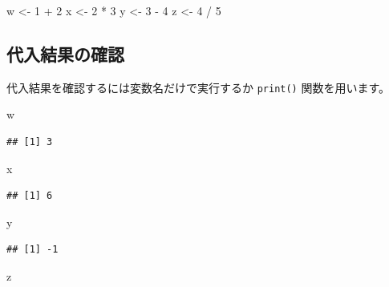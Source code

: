 \documentclass[
  12pt,
]{book}
\newenvironment{Shaded}{\begin{snugshade}}{\end{snugshade}}
\newcommand{\DecValTok}[1]{\textcolor[rgb]{0.00,0.00,0.81}{#1}}
\newcommand{\NormalTok}[1]{#1}
\newcommand{\OtherTok}[1]{\textcolor[rgb]{0.56,0.35,0.01}{#1}}
\newcommand{\SpecialCharTok}[1]{\textcolor[rgb]{0.00,0.00,0.00}{#1}}
\begin{document}
\begin{Shaded}
\begin{Highlighting}[]
\NormalTok{w }\OtherTok{\textless{}{-}} \DecValTok{1} \SpecialCharTok{+} \DecValTok{2}
\NormalTok{x }\OtherTok{\textless{}{-}} \DecValTok{2} \SpecialCharTok{*} \DecValTok{3}
\NormalTok{y }\OtherTok{\textless{}{-}} \DecValTok{3} \SpecialCharTok{{-}} \DecValTok{4}
\NormalTok{z }\OtherTok{\textless{}{-}} \DecValTok{4} \SpecialCharTok{/} \DecValTok{5}
\end{Highlighting}
\end{Shaded}

\hypertarget{ux4ee3ux5165ux7d50ux679cux306eux78baux8a8d}{%
\subsection{代入結果の確認}\label{ux4ee3ux5165ux7d50ux679cux306eux78baux8a8d}}

代入結果を確認するには変数名だけで実行するか \texttt{print()} 関数を用います。

\begin{Shaded}
\begin{Highlighting}[]
\NormalTok{w}
\end{Highlighting}
\end{Shaded}

\begin{verbatim}
## [1] 3
\end{verbatim}

\begin{Shaded}
\begin{Highlighting}[]
\NormalTok{x}
\end{Highlighting}
\end{Shaded}

\begin{verbatim}
## [1] 6
\end{verbatim}

\begin{Shaded}
\begin{Highlighting}[]
\NormalTok{y}
\end{Highlighting}
\end{Shaded}

\begin{verbatim}
## [1] -1
\end{verbatim}

\begin{Shaded}
\begin{Highlighting}[]
\NormalTok{z}
\end{Highlighting}
\end{Shaded}
\end{document}
